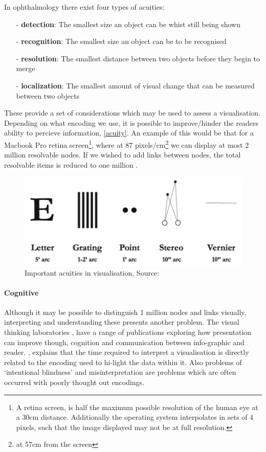  In ophthalmology there exist four types of  acuities: 
\begin{itemize}
\item[-] \textbf{detection}: The smallest size an object can be whist still being shown
\item[-] \textbf{recognition}: The smallest size an object can be to be recognised
\item[-] \textbf{resolution}: The smallest distance between two objects before they begin to merge
\item[-] \textbf{localization}: The smallest amount of visual change that can be measured between two objects
\end{itemize}

These provide a set of considerations which may be used to assess a visualisation. Depending on what encoding we use, it is possible to improve/hinder the readers ability to percieve information, \autoref{acuity}. An example of this would be that for a Macbook Pro retina screen\footnote{A retina screen, is half the maximum possible resolution of the human eye at a 30cm distance. Additionally the operating system interpolates in sets of 4 pixels, such that the image displayed may not be at full resolution.}, where at 87 pixels/cm\footnote{at 57cm from the screen} we can display at most 2 million resolvable nodes. If we wished to add links between nodes, the total resolvable items is reduced to one million
\citep{ch10}. 

\begin{figure}[H]
\begin{center}
\includegraphics[scale=.6]{figures_c1/acuity.png}
\end{center}
\caption{Important acuities in visualisation, Source: \citep{ch10,ware}}\label{acuity}
\end{figure}


\paragraph*{Cognitive}
Although it may be possible to distinguish 1 million nodes and links visually, interpreting and understanding these presents another problem. The visual thinking laboratories \citep{vt}, have a range of publications exploring how presentation can improve though, cognition and communication between info-graphic and reader. \citep{OpenVis}, explains that the time required to interpret a visualisation is directly related to the encoding used to hi-light the data within it. Also problems of `intentional blindness' and misinterpretation are problems which are often occurred with poorly thought out encodings.  

